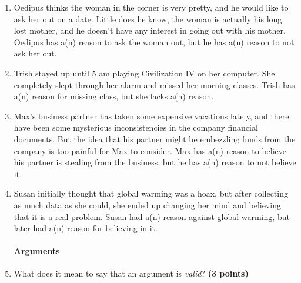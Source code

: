 \documentclass[10pt]{article}
\begin{document}
\begin{enumerate}
 \item Oedipus thinks the woman in the corner is very pretty, and he would like to ask her out on a date.  Little does he know, the woman is actually his long lost mother, and he doesn't have any interest in going out with his mother.  Oedipus has a(n) \underline{\hspace{2in}} reason to ask the woman out, but he has a(n) \underline{\hspace{2in}} reason to not ask her out.
 
 \item Trish stayed up until 5 am playing Civilization IV on her computer.  She completely slept through her alarm and missed her morning classes. Trish has a(n) \underline{\hspace{2in}} reason for missing class, but she lacks a(n) \underline{\hspace{2in}} reason.
 
 \item Max's business partner has taken some expensive vacations lately, and there have been some mysterious inconsistencies in the company financial documents.  But the idea that his partner might be embezzling funds from the company is too painful for Max to consider.  Max has a(n) \underline{\hspace{2in}} reason to believe his partner is stealing from the business, but he has a(n) \underline{\hspace{2in}} reason to not believe it.
 
 \item Susan initially thought that global warming was a hoax, but after collecting as much data as she could, she ended up changing her mind and believing that it is a real problem. Susan had a(n) \underline{\hspace{2in}} reason against global warming, but later had a(n) \underline{\hspace{2in}} reason for believing in it.
 

\paragraph{Arguments}

  \item What does it mean to say that an argument is \textit{valid}? \textbf{(3 points)}
  
  \vspace{1cm}
  

\end{enumerate}
\end{document}
